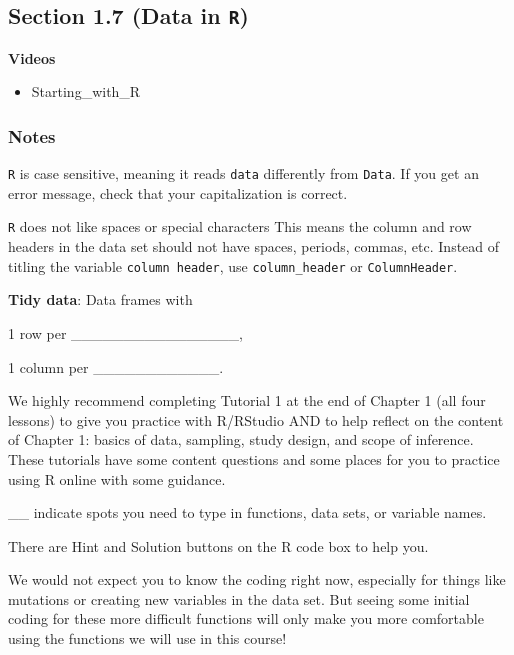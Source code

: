 \documentclass[
]{report}
\providecommand{\tightlist}{%
  \setlength{\itemsep}{0pt}\setlength{\parskip}{0pt}}
\newcommand{\rgi}{\hspace{24pt}}  %
\begin{document}
\hypertarget{section-1.7-data-in-r}{%
\subsection*{\texorpdfstring{Section 1.7 (Data in \texttt{R})}{Section 1.7 (Data in R)}}\label{section-1.7-data-in-r}}

\textbf{Videos}

\begin{itemize}
\tightlist
\item
  Starting\_with\_R
\end{itemize}


\hypertarget{notes-3}{%
\subsubsection*{Notes}\label{notes-3}}

\texttt{R} is case sensitive, meaning it reads \texttt{data} differently from \texttt{Data}. If you get an error message, check that your capitalization is correct.

\texttt{R} does not like spaces or special characters This means the column and row headers in the data set should not have spaces, periods, commas, etc. Instead of titling the variable \texttt{column\ header}, use \texttt{column\_header} or \texttt{ColumnHeader}.

\textbf{Tidy data}: Data frames with

\rgi 1 row per \_\_\_\_\_\_\_\_\_\_\_\_\_\_\_\_,

\rgi 1 column per \_\_\_\_\_\_\_\_\_\_\_\_.

We highly recommend completing Tutorial 1 at the end of Chapter 1 (all four lessons) to give you practice with R/RStudio AND to help reflect on the content of Chapter 1: basics of data, sampling, study design, and scope of inference. These tutorials have some content questions and some places for you to practice using R online with some guidance.

\rgi \_\_ indicate spots you need to type in functions, data sets, or variable names.

\rgi There are Hint and Solution buttons on the R code box to help you.

We would not expect you to know the coding right now, especially for things like mutations or creating new variables in the data set. But seeing some initial coding for these more difficult functions will only make you more comfortable using the functions we will use in this course!
\end{document}
